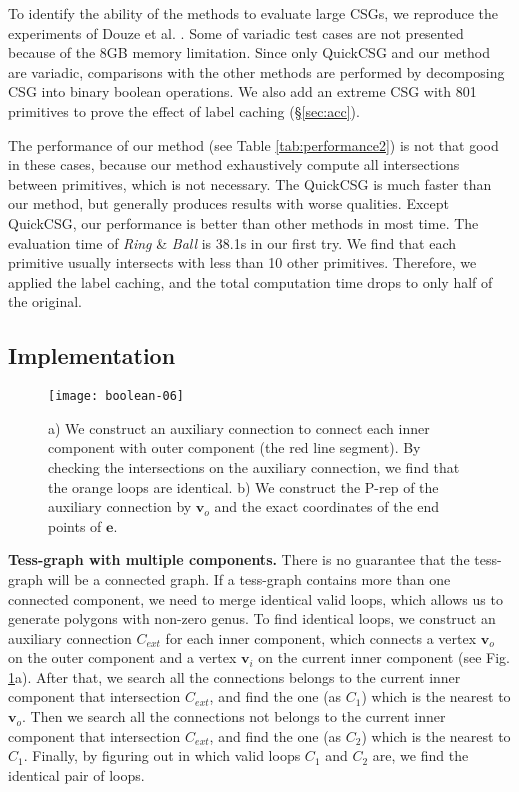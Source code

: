 To identify the ability of the methods to evaluate large CSGs, we reproduce the experiments of Douze et al. \cite{douze2015quickcsg}. Some of variadic test cases are not presented because of the 8GB memory limitation. Since only QuickCSG and our method are variadic, comparisons with the other methods are performed by decomposing CSG into binary boolean operations. We also add an extreme CSG with 801 primitives to prove the effect of label caching (\S\ref{sec:acc}).

The performance of our method  (see Table \ref{tab:performance2}) is not that good in these cases, because our method exhaustively compute all intersections between primitives, which is not necessary. The QuickCSG is much faster than our method, but generally produces results with worse qualities. Except QuickCSG, our performance is better than other methods in most time. The evaluation time of \emph{Ring} \& \emph{Ball} is 38.1s in our first try. We find that each primitive usually intersects with less than 10 other primitives. Therefore, we applied the label caching, and the total computation time drops to only half of the original.

\subsection{Implementation}
\label{sec:esubroutine}

\begin{figure}[t]
\centering
\texttt{[image: boolean-06]}
\caption{a) We construct an auxiliary connection to connect each inner component with outer component (the red line segment). By checking the intersections on the auxiliary connection, we find that the orange loops are identical.  b) We construct the P-rep of the auxiliary connection by $\bm{v}_o$ and the exact coordinates of the end points of $\bm{e}$. }
\label{fig:dual}
\end{figure}


\vspace{0.5em}
\noindent\textbf{Tess-graph with multiple components. }
There is no guarantee that the tess-graph will be a connected graph. If a tess-graph contains more than one connected component, we need to merge identical valid loops, which allows us to generate polygons with non-zero genus. To find identical loops, we construct an auxiliary connection $C_{ext}$ for each inner component, which connects a vertex $\bm{v}_o$ on the outer component and a vertex $\bm{v}_i$ on the current inner component (see Fig. \ref{fig:dual}a). After that, we search all the connections belongs to the current inner component that intersection $C_{ext}$, and find the one (as $C_1$) which is the nearest to $\bm{v}_o$. Then we search all the connections not belongs to the current inner component that intersection $C_{ext}$, and find the one (as $C_2$) which is the nearest to $C_1$. Finally, by figuring out in which valid loops $C_1$ and $C_2$ are, we find the identical pair of loops.

